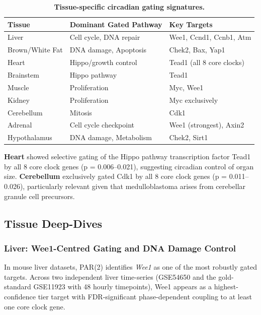 \documentclass[11pt,a4paper]{article}
\begin{document}
\begin{table}[H]
\centering
\caption{\textbf{Tissue-specific circadian gating signatures.}}
\label{tab:signatures}
\begin{tabular}{lll}
\toprule
\textbf{Tissue} & \textbf{Dominant Gated Pathway} & \textbf{Key Targets} \\
\midrule
Liver & Cell cycle, DNA repair & Wee1, Ccnd1, Ccnb1, Atm \\
Brown/White Fat & DNA damage, Apoptosis & Chek2, Bax, Yap1 \\
Heart & Hippo/growth control & Tead1 (all 8 core clocks) \\
Brainstem & Hippo pathway & Tead1 \\
Muscle & Proliferation & Myc, Wee1 \\
Kidney & Proliferation & Myc exclusively \\
Cerebellum & Mitosis & Cdk1 \\
Adrenal & Cell cycle checkpoint & Wee1 (strongest), Axin2 \\
Hypothalamus & DNA damage, Metabolism & Chek2, Sirt1 \\
\bottomrule
\end{tabular}
\end{table}

\textbf{Heart} showed selective gating of the Hippo pathway transcription factor Tead1 by all 8 core clock genes (p = 0.006--0.021), suggesting circadian control of organ size. \textbf{Cerebellum} exclusively gated Cdk1 by all 8 core clock genes (p = 0.011--0.026), particularly relevant given that medulloblastoma arises from cerebellar granule cell precursors.

\subsection{Tissue Deep-Dives}

\subsubsection*{Liver: Wee1-Centred Gating and DNA Damage Control}

In mouse liver datasets, PAR(2) identifies \textit{Wee1} as one of the most robustly gated targets. Across two independent liver time-series (GSE54650 and the gold-standard GSE11923 with 48 hourly timepoints), Wee1 appears as a highest-confidence tier target with FDR-significant phase-dependent coupling to at least one core clock gene.
\end{document}
